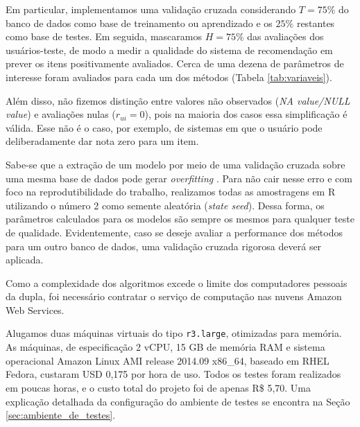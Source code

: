Em particular, implementamos uma validação cruzada considerando $T=75\%$ do banco de dados como base de treinamento ou aprendizado e os $25\%$ restantes como base de testes. Em seguida, mascaramos $H=75\%$ das avaliações dos usuários-teste, de modo a medir a qualidade do sistema de recomendação em prever os itens positivamente avaliados. Cerca de uma dezena de parâmetros de interesse foram avaliados para cada um dos métodos (Tabela \ref{tab:variaveis}). 

Além disso, não fizemos distinção entre valores não observados (\textit{NA value/NULL value}) e avaliações nulas ($r_{ui}=0$), pois na maioria dos casos essa simplificação é válida. Esse não é o caso, por exemplo, de sistemas em que o usuário pode deliberadamente dar  nota zero para um item.

Sabe-se que a extração de um modelo por meio de uma validação cruzada sobre uma mesma base de dados pode gerar \textit{overfitting} \cite{ng1997preventing}. Para não cair nesse erro e com foco na reprodutibilidade do trabalho, realizamos todas as amostragens em R utilizando o número 2 como semente aleatória (\textit{state seed}). Dessa forma, os parâmetros calculados para os modelos são sempre os mesmos para qualquer teste de qualidade. Evidentemente, caso se deseje avaliar a performance dos métodos para um outro banco de dados, uma validação cruzada rigorosa deverá ser aplicada. 



Como a complexidade dos algoritmos excede o limite dos computadores pessoais da dupla, foi necessário contratar o serviço de computação nas nuvens Amazon Web Services.

Alugamos duas máquinas virtuais do tipo \texttt{r3.large}, otimizadas para memória. As máquinas, de especificação 2 vCPU, 15 GB de memória RAM e sistema operacional Amazon Linux AMI release 2014.09 x86\_64, baseado em RHEL Fedora, custaram USD 0,175 por hora de uso. Todos os testes foram realizados em poucas horas, e o custo total do projeto foi de apenas R\$ 5,70. Uma explicação detalhada da configuração do ambiente de testes se encontra na Seção \ref{sec:ambiente_de_testes}.